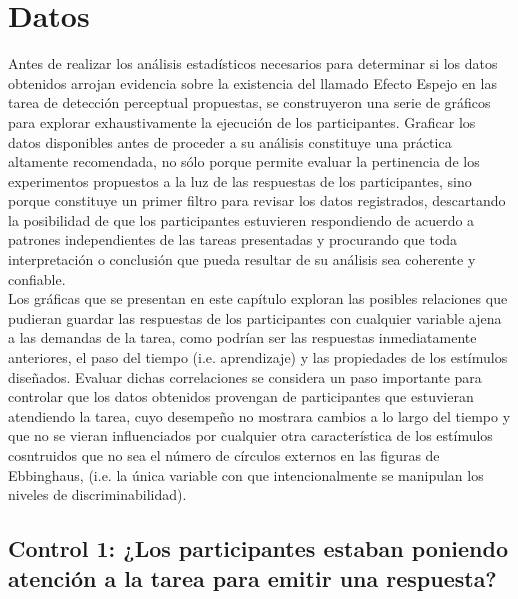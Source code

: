 
\chapter{Datos} %

\label{Cap_Data} %


Antes de realizar los análisis estadísticos necesarios para determinar si los datos obtenidos arrojan evidencia sobre la existencia del llamado Efecto Espejo en las tarea de detección perceptual propuestas, se construyeron una serie de gráficos para explorar exhaustivamente la ejecución de los participantes. Graficar los datos disponibles antes de proceder a su análisis constituye una práctica altamente recomendada, no sólo porque permite evaluar la pertinencia de los experimentos propuestos a la luz de las respuestas de los participantes, sino porque constituye un primer filtro para revisar los datos registrados, descartando la posibilidad de que los participantes estuvieren respondiendo de acuerdo a patrones independientes de las tareas presentadas y procurando que toda interpretación o conclusión que pueda resultar de su análisis sea coherente y confiable.\\

Los gráficas que se presentan en este capítulo exploran las posibles relaciones que pudieran guardar las respuestas de los participantes con cualquier variable ajena a las demandas de la tarea, como podrían ser las respuestas inmediatamente anteriores, el paso del tiempo (i.e. aprendizaje) y las propiedades de los estímulos diseñados. Evaluar dichas correlaciones se considera un paso importante para controlar que los datos obtenidos provengan de participantes que estuvieran atendiendo la tarea, cuyo desempeño no mostrara cambios a lo largo del tiempo y que no se vieran influenciados por cualquier otra característica de los estímulos cosntruidos que no sea el número de círculos externos en las figuras de Ebbinghaus, (i.e. la única variable con que intencionalmente se manipulan los niveles de discriminabilidad).\\


\section{Control 1: ¿Los participantes estaban poniendo atención a la tarea para emitir una respuesta?}

